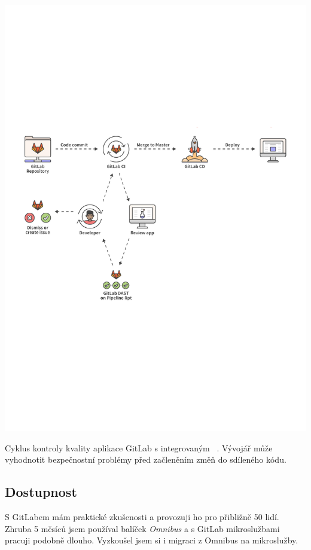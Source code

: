         \begin{iffigure}
            \centering
            \includegraphics[width=\textwidth]{media/gitlab-review-cycle.pdf}
            \caption{Cyklus kontroly kvality aplikace GitLab s integrovaným ~\cite{gitlab-app-security}. Vývojář může vyhodnotit bezpečnostní problémy před začleněním změň do sdíleného kódu.}
            \label{fig:gitlab-review-cycle}
        \end{iffigure}

    \subsection{Dostupnost}
        S GitLabem mám praktické zkušenosti a provozuji ho pro přibližně 50 lidí. Zhruba 5 měsíců jsem používal balíček \textit{Omnibus} a s GitLab mikroslužbami pracuji podobně dlouho. Vyzkoušel jsem si i migraci z Omnibus na mikroslužby.

